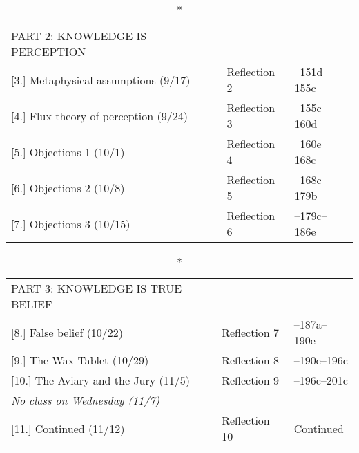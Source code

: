 \documentclass[article,oneside]{memoir}
\begin{document}
								
\begin{center}
\begin{longtable}{p{6cm}p{3cm}p{5cm}}
  \caption*{PART 2: KNOWLEDGE IS PERCEPTION} \\

		
[3.] Metaphysical assumptions  (9/17)		& Reflection 2		&  --151d--155c \\ 


[4.] Flux theory of perception  (9/24)				& Reflection 3		& --155c--160d \\ 


[5.] Objections 1  (10/1)				& Reflection 4		& --160e--168c \\ 


[6.] Objections 2 (10/8)				& Reflection 5		 & --168c--179b \\


[7.] Objections 3 (10/15)	   			& Reflection 6		 & --179c--186e    \\

\end{longtable}
\end{center}
\vspace{-1.5cm}
\begin{center}
\begin{longtable}{p{6cm}p{3cm}p{5cm}}
 
  \caption*{PART 3: KNOWLEDGE IS TRUE BELIEF	} \\
  					
  
[8.] False belief (10/22)			 	& Reflection 7		& --187a--190e  \\


[9.] The Wax Tablet	(10/29)			& Reflection 8		& --190e--196c\\
[10.] The Aviary and the Jury	(11/5)	& Reflection 9		& --196c--201c \\ 

\emph{No class on Wednesday (11/7)}		    					& 				& \\

[11.] Continued (11/12)				& Reflection 10		& Continued \\ 

\end{longtable}
\end{center}
\end{document}
